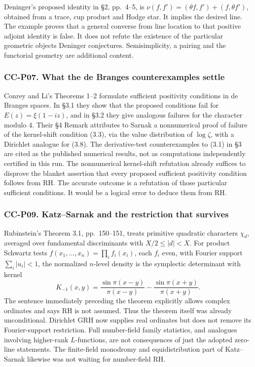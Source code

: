 Deninger's proposed identity in §2, pp.~4--5, is
\(\nu(f,f')=(\theta f,f')+(f,\theta f')\), obtained from a trace, cup
product and Hodge star. It implies the desired line. The example proves
that a general converse from line location to that positive adjoint
identity is false. It does not refute the existence of the particular
geometric objects Deninger conjectures. Semisimplicity, a pairing and
the functorial geometry are additional content.

\subsubsection{CC-P07. What the de Branges counterexamples
settle}\label{cc-p07.-what-the-de-branges-counterexamples-settle}

Conrey and Li's Theorems 1--2 formulate sufficient positivity conditions
in de Branges spaces. In §3.1 they show that the proposed conditions
fail for \(E(z)=\xi(1-iz)\), and in §3.2 they give analogous failures
for the character modulo 4. Their §4 Remark attributes to Sarnak a
nonnumerical proof of failure of the kernel-shift condition (3.3), via
the value distribution of \(\log\zeta\), with a Dirichlet analogue for
(3.8). The derivative-test counterexamples to (3.1) in §3 are cited as
the published numerical results, not as computations independently
certified in this run. The nonnumerical kernel-shift refutation already
suffices to disprove the blanket assertion that every proposed
sufficient positivity condition follows from RH. The accurate outcome is
a refutation of those particular sufficient conditions. It would be a
logical error to deduce them from RH.

\subsubsection{CC-P09. Katz--Sarnak and the restriction that
survives}\label{cc-p09.-katzsarnak-and-the-restriction-that-survives}

Rubinstein's Theorem 3.1, pp.~150--151, treats primitive quadratic
characters \(\chi_d\), averaged over fundamental discriminants with
\(X/2\le|d|<X\). For product Schwartz tests
\(f(x_1,\ldots,x_n)=\prod_i f_i(x_i)\), each \(f_i\) even, with Fourier
support \(\sum_i|u_i|<1\), the normalized \(n\)-level density is the
symplectic determinant with kernel \[
 K_{-1}(x,y)=\frac{\sin\pi(x-y)}{\pi(x-y)}
            -\frac{\sin\pi(x+y)}{\pi(x+y)}.
\] The sentence immediately preceding the theorem explicitly allows
complex ordinates and says RH is not assumed. Thus the theorem itself
was already unconditional. Dirichlet GRH now supplies real ordinates but
does not remove its Fourier-support restriction. Full number-field
family statistics, and analogues involving higher-rank \(L\)-functions,
are not consequences of just the adopted zero-line statements. The
finite-field monodromy and equidistribution part of Katz--Sarnak
likewise was not waiting for number-field RH.

